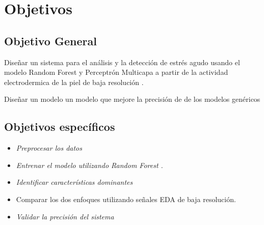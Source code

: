 \section{Objetivos}

\subsection{Objetivo General}

Diseñar   un sistema para el análisis y la detección de estrés agudo  usando el modelo Random Forest y Perceptrón Multicapa  a partir de la actividad electrodermica de la piel de baja resolución .

Diseñar un modelo  un modelo que mejore la precisión de de los modelos genéricos 

\subsection{Objetivos específicos}

\textit{
}

\begin{itemize}

\item \textit{Preprocesar los datos  }


\item \textit{Entrenar el modelo utilizando  Random Forest .}

\item \textit{Identificar   características dominantes  }
\item  Comparar los dos  enfoques  utilizando señales EDA de baja resolución.


\item \textit{Validar la precisión del sistema }

\end{itemize}








